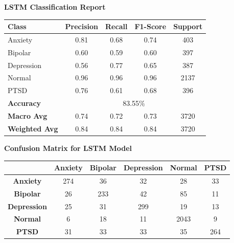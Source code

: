 \begin{center}
    \textbf{LSTM Classification Report} \\[0.5em]
    \begin{tabular}{|l|c|c|c|c|}
        \hline
        \textbf{Class} & \textbf{Precision} & \textbf{Recall} & \textbf{F1-Score} & \textbf{Support} \\ \hline
        Anxiety        & 0.81               & 0.68            & 0.74              & 403              \\ \hline
        Bipolar        & 0.60               & 0.59            & 0.60              & 397              \\ \hline
        Depression     & 0.56               & 0.77            & 0.65              & 387              \\ \hline
        Normal         & 0.96               & 0.96            & 0.96              & 2137             \\ \hline
        PTSD           & 0.76               & 0.61            & 0.68              & 396              \\ \hline
        \textbf{Accuracy} & \multicolumn{4}{|c|}{83.55\%} \\ \hline
        \textbf{Macro Avg} & 0.74            & 0.72            & 0.73              & 3720             \\ \hline
        \textbf{Weighted Avg} & 0.84         & 0.84            & 0.84              & 3720             \\ \hline
    \end{tabular}
\end{center}

\vspace{0.25em}

\begin{center}
    \textbf{Confusion Matrix for LSTM Model} \\[0.5em]
    \begin{tabular}{|c|c|c|c|c|c|}
        \hline
        & \textbf{Anxiety} & \textbf{Bipolar} & \textbf{Depression} & \textbf{Normal} & \textbf{PTSD} \\ \hline
        \textbf{Anxiety}    & 274 & 36  & 32  & 28  & 33  \\ \hline
        \textbf{Bipolar}    & 26  & 233 & 42  & 85  & 11  \\ \hline
        \textbf{Depression} & 25  & 31  & 299 & 19  & 13  \\ \hline
        \textbf{Normal}     & 6   & 18  & 11  & 2043 & 9   \\ \hline
        \textbf{PTSD}       & 31  & 33  & 33  & 35  & 264 \\ \hline
    \end{tabular}
\end{center}

